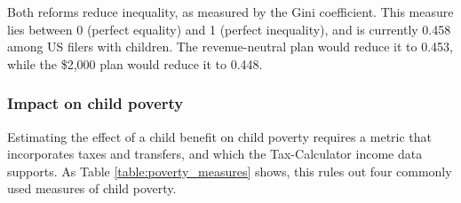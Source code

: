 \documentclass[12pt]{article}
\begin{document}
Both reforms reduce inequality, as measured by the Gini coefficient. This measure lies between 0 (perfect equality) and 1 (perfect inequality), and is currently 0.458 among US filers with children. The revenue-neutral plan would reduce it to 0.453, while the \$2,000 plan would reduce it to 0.448.

\subsubsection{Impact on child poverty}

Estimating the effect of a child benefit on child poverty requires a metric that incorporates taxes and transfers, and which the Tax-Calculator income data supports. As Table \ref{table:poverty_measures} shows, this rules out four commonly used measures of child poverty.

\clearpage
\end{document}
